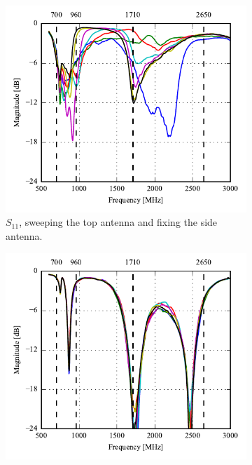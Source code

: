 \begin{figure}[htbp]
    \centering
    \begin{subfigure}{0.49\linewidth}
        \centering
        \includegraphics{img/tech_sol/nonresonant/prototype/s11_csh1.pdf}
        \caption{$S_{11}$, sweeping the top antenna and fixing the side antenna.}
    \end{subfigure}
    \hfill
    \begin{subfigure}{0.49\linewidth}
        \centering
        \includegraphics{img/tech_sol/nonresonant/prototype/s22_csh1.pdf}

\end{subfigure}
\end{figure}
